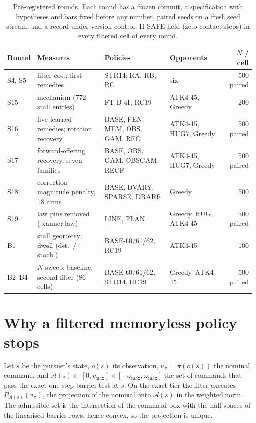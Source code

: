 \documentclass{l4dc2027}
\newcommand{\vmax}{v_{\max}}
\newcommand{\wmax}{\omega_{\max}}
\newcommand{\adm}{\mathcal{A}}
\begin{document}
\begin{table}[t]
\centering\footnotesize
\caption{Pre-registered rounds. Each round has a frozen commit, a specification with hypotheses and bars fixed before any number, paired seeds on a fresh seed stream, and a record under version control. H-SAFE held (zero contact steps) in every filtered cell of every round.}
\label{tab:rounds}
\begin{tabular}{@{}l p{5.6cm} p{4.5cm} p{2.5cm} r@{}}
\toprule
Round & Measures & Policies & Opponents & $N$ / cell \\
\midrule
S4, S5 & filter cost; first remedies & STR14; RA, RB, RC & six & 500 paired \\
S15 & mechanism (772 stall entries) & FT-B-41, RC19 & ATK4-45, Greedy & 200 \\
S16 & five learned remedies; rotation recovery & BASE, PEN, MEM, OBS, GAM, REC & ATK4-45, HUG7, Greedy & 500 paired \\
S17 & forward-offering recovery, seven families & BASE, OBS, GAM, OBSGAM, RECF & ATK4-45, HUG7, Greedy & 500 paired \\
S18 & correction-magnitude penalty, 18 arms & BASE, DVARY, SPARSE, DRARE & Greedy & 500 \\
S19 & law pins removed (planner law) & LINE, PLAN & Greedy, HUG, ATK4-45 & 500 paired \\
B1 & stall geometry; dwell (det.\ / stoch.) & BASE-60/61/62, RC19 & ATK4-45 & 100 \\
B2--B4 & $N$ sweep; baseline; second filter (86 cells) & BASE-60/61/62, STR14, RC19 & Greedy, ATK4-45 & 500 paired \\
\bottomrule
\end{tabular}
\end{table}

\section{Why a filtered memoryless policy stops}\label{sec:formal}

Let $s$ be the pursuer's state, $o(s)$ its observation, $u_\pi = \pi(o(s))$ the nominal command, and $\adm(s) \subset [0,\vmax] \times [-\wmax,\wmax]$ the set of commands that pass the exact one-step barrier test at $s$. On the exact tier the filter executes $P_{\adm(s)}(u_\pi)$, the projection of the nominal onto $\adm(s)$ in the weighted norm. The admissible set is the intersection of the command box with the half-spaces of the linearised barrier rows, hence convex, so the projection is unique.
\end{document}
